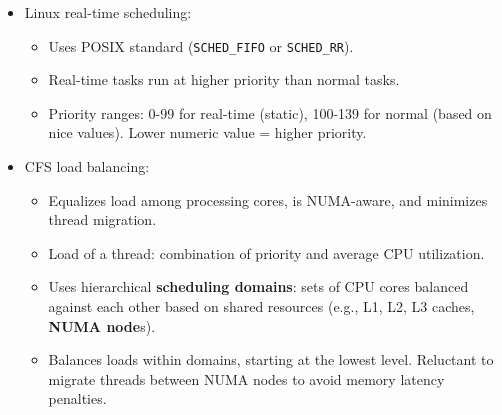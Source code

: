 \begin{itemize}
\begin{itemize}
        \end{itemize}
    \item Linux real-time scheduling:
        \begin{itemize}
            \item Uses POSIX standard (\texttt{SCHED\_FIFO} or \texttt{SCHED\_RR}).
            \item Real-time tasks run at higher priority than normal tasks.
            \item Priority ranges: 0-99 for real-time (static), 100-139 for normal (based on nice values). Lower numeric value = higher priority.
        \end{itemize}
    \item CFS load balancing:
        \begin{itemize}
            \item Equalizes load among processing cores, is NUMA-aware, and minimizes thread migration.
            \item Load of a thread: combination of priority and average CPU utilization.
            \item Uses hierarchical \textbf{scheduling domains}: sets of CPU cores balanced against each other based on shared resources (e.g., L1, L2, L3 caches, \textbf{NUMA node}s).
            \item Balances loads within domains, starting at the lowest level. Reluctant to migrate threads between NUMA nodes to avoid memory latency penalties.
        \end{itemize}
\end{itemize}

